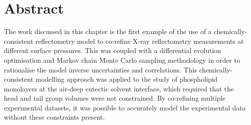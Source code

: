 \section*{Abstract}
The work discussed in this chapter is the first example of the use of a chemically-consistent reflectometry model to co-refine X-ray reflectometry measurements at different surface pressures.
This was coupled with a differential evolution optimisation and Markov chain Monte Carlo sampling methodology in order to rationalise the model inverse uncertainties and correlations.
This chemically-consistent modelling approach was applied to the study of phospholipid monolayers at the air-deep eutectic solvent interface, which required that the head and tail group volumes were not constrained.
By co-refining multiple experimental datasets, it was possible to accurately model the experimental data without these constraints present.
